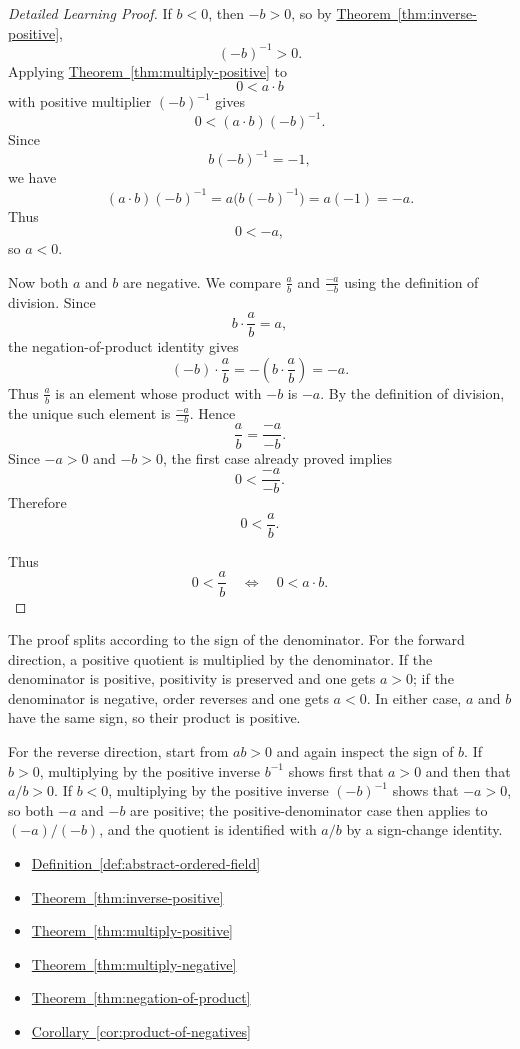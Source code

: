 \begin{proof}[Detailed Learning Proof]
If $b<0$, then $-b>0$, so by
\hyperref[thm:inverse-positive]{Theorem~\ref*{thm:inverse-positive}},
\[
(-b)^{-1}>0.
\]
Applying
\hyperref[thm:multiply-positive]{Theorem~\ref*{thm:multiply-positive}}
to
\[
0<a\cdot b
\]
with positive multiplier $(-b)^{-1}$ gives
\[
0<(a\cdot b)(-b)^{-1}.
\]
Since
\[
b(-b)^{-1}=-1,
\]
we have
\[
(a\cdot b)(-b)^{-1}=a\bigl(b(-b)^{-1}\bigr)=a(-1)=-a.
\]
Thus
\[
0<-a,
\]
so $a<0$.

Now both $a$ and $b$ are negative.  We compare $\frac{a}{b}$ and
$\frac{-a}{-b}$ using the definition of division.  Since
\[
b\cdot\frac{a}{b}=a,
\]
the negation-of-product identity gives
\[
(-b)\cdot\frac{a}{b}
=
-\left(b\cdot\frac{a}{b}\right)
=
-a.
\]
Thus $\frac{a}{b}$ is an element whose product with $-b$ is $-a$.  By the
definition of division, the unique such element is $\frac{-a}{-b}$.  Hence
\[
\frac{a}{b}=\frac{-a}{-b}.
\]
Since $-a>0$ and $-b>0$, the first case already proved implies
\[
0<\frac{-a}{-b}.
\]
Therefore
\[
0<\frac{a}{b}.
\]

Thus
\[
0<\frac{a}{b}
\quad\Longleftrightarrow\quad
0<a\cdot b.
\]
\end{proof}

\begin{remark*}
The proof splits according to the sign of the denominator.  For the forward
direction, a positive quotient is multiplied by the denominator.  If the
denominator is positive, positivity is preserved and one gets $a>0$; if the
denominator is negative, order reverses and one gets $a<0$.  In either case,
$a$ and $b$ have the same sign, so their product is positive.

For the reverse direction, start from $ab>0$ and again inspect the sign of
$b$.  If $b>0$, multiplying by the positive inverse $b^{-1}$ shows first that
$a>0$ and then that $a/b>0$.  If $b<0$, multiplying by the positive inverse
$(-b)^{-1}$ shows that $-a>0$, so both $-a$ and $-b$ are positive; the
positive-denominator case then applies to $(-a)/(-b)$, and the quotient is
identified with $a/b$ by a sign-change identity.
\end{remark*}

\begin{dependencies}
\begin{itemize}
  \item \hyperref[def:abstract-ordered-field]{Definition~\ref*{def:abstract-ordered-field}}
  \item \hyperref[thm:inverse-positive]{Theorem~\ref*{thm:inverse-positive}}
  \item \hyperref[thm:multiply-positive]{Theorem~\ref*{thm:multiply-positive}}
  \item \hyperref[thm:multiply-negative]{Theorem~\ref*{thm:multiply-negative}}
  \item \hyperref[thm:negation-of-product]{Theorem~\ref*{thm:negation-of-product}}
  \item \hyperref[cor:product-of-negatives]{Corollary~\ref*{cor:product-of-negatives}}
\end{itemize}
\end{dependencies}

\clearpage
